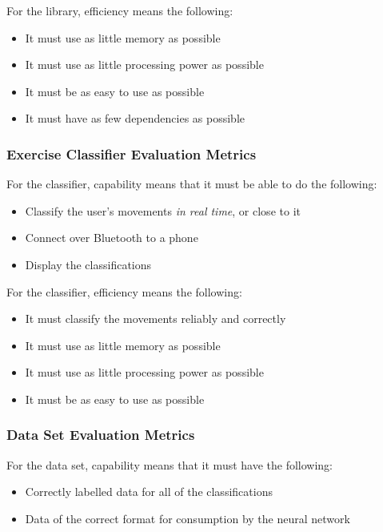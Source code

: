 \documentclass[a4paper]{article}
\begin{document}
For the library, efficiency means the following:
\begin{itemize}
\item It must use as little memory as possible
\item It must use as little processing power as possible
\item It must be as easy to use as possible
\item It must have as few dependencies as possible
\end{itemize}

\subsubsection{Exercise Classifier Evaluation Metrics}

For the classifier, capability means that it must be able to do the following:

\begin{itemize}
\item Classify the user's movements \textit{in real time}, or close to it
\item Connect over Bluetooth to a phone
\item Display the classifications
\end{itemize}

For the classifier, efficiency means the following:

\begin{itemize}
\item It must classify the movements reliably and correctly
\item It must use as little memory as possible
\item It must use as little processing power as possible
\item It must be as easy to use as possible
\end{itemize}

\subsubsection{Data Set Evaluation Metrics}

For the data set, capability means that it must have the following:

\begin{itemize}
\item Correctly labelled data for all of the classifications
\item Data of the correct format for consumption by the neural network
\end{itemize}
\end{document}
